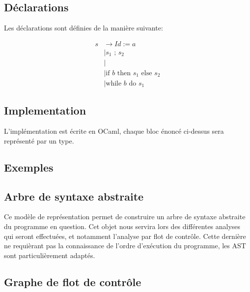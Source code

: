 \documentclass[a4paper, 12pt]{article}
\begin{document}
\subsection{Déclarations}
Les déclarations sont définies de la manière suivante:

\begin{align*}
s & \rightarrow Id := a \\
  & \mid s_1 \text{ ; } s_2 \\
  & \mid \\
  & \mid \text{if } b \text{ then } s_1 \text{ else } s_2 \\
  & \mid \text{while } b \text{ do } s_1
\end{align*}

\subsection{Implementation}
L'implémentation est écrite en OCaml, chaque bloc énoncé ci-dessus sera représenté par un type.

\subsection{Exemples}

\subsection{Arbre de syntaxe abstraite}
Ce modèle de représentation permet de construire un arbre de syntaxe abstraite du programme en question. Cet objet nous servira lors des différentes analyses qui seront effectuées, et notamment l'analyse par flot de contrôle. Cette dernière ne requièrant pas la connaissance de l'ordre d'exécution du programme, les AST sont particulièrement adaptés.

\subsection{Graphe de flot de contrôle}
\end{document}
